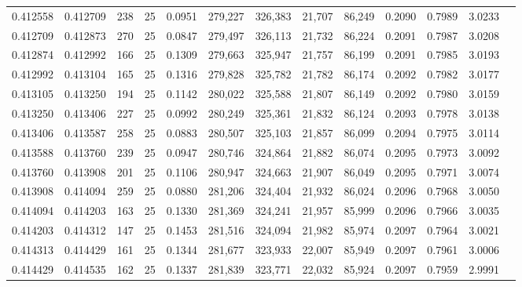 \begin{tabular}{rrrrrrrrrrrrr}
0.412558 & 0.412709 &   238 &  25 &                                     0.0951 & 279,227 & 326,383 &  21,707 &  86,249 & 0.2090 & 0.7989 & 3.0233 \\
0.412709 & 0.412873 &   270 &  25 &                                     0.0847 & 279,497 & 326,113 &  21,732 &  86,224 & 0.2091 & 0.7987 & 3.0208 \\
0.412874 & 0.412992 &   166 &  25 &                                     0.1309 & 279,663 & 325,947 &  21,757 &  86,199 & 0.2091 & 0.7985 & 3.0193 \\
0.412992 & 0.413104 &   165 &  25 &                                     0.1316 & 279,828 & 325,782 &  21,782 &  86,174 & 0.2092 & 0.7982 & 3.0177 \\
0.413105 & 0.413250 &   194 &  25 &                                     0.1142 & 280,022 & 325,588 &  21,807 &  86,149 & 0.2092 & 0.7980 & 3.0159 \\
0.413250 & 0.413406 &   227 &  25 &                                     0.0992 & 280,249 & 325,361 &  21,832 &  86,124 & 0.2093 & 0.7978 & 3.0138 \\
0.413406 & 0.413587 &   258 &  25 &                                     0.0883 & 280,507 & 325,103 &  21,857 &  86,099 & 0.2094 & 0.7975 & 3.0114 \\
0.413588 & 0.413760 &   239 &  25 &                                     0.0947 & 280,746 & 324,864 &  21,882 &  86,074 & 0.2095 & 0.7973 & 3.0092 \\
0.413760 & 0.413908 &   201 &  25 &                                     0.1106 & 280,947 & 324,663 &  21,907 &  86,049 & 0.2095 & 0.7971 & 3.0074 \\
0.413908 & 0.414094 &   259 &  25 &                                     0.0880 & 281,206 & 324,404 &  21,932 &  86,024 & 0.2096 & 0.7968 & 3.0050 \\
0.414094 & 0.414203 &   163 &  25 &                                     0.1330 & 281,369 & 324,241 &  21,957 &  85,999 & 0.2096 & 0.7966 & 3.0035 \\
0.414203 & 0.414312 &   147 &  25 &                                     0.1453 & 281,516 & 324,094 &  21,982 &  85,974 & 0.2097 & 0.7964 & 3.0021 \\
0.414313 & 0.414429 &   161 &  25 &                                     0.1344 & 281,677 & 323,933 &  22,007 &  85,949 & 0.2097 & 0.7961 & 3.0006 \\
0.414429 & 0.414535 &   162 &  25 &                                     0.1337 & 281,839 & 323,771 &  22,032 &  85,924 & 0.2097 & 0.7959 & 2.9991 \\

\end{tabular}
